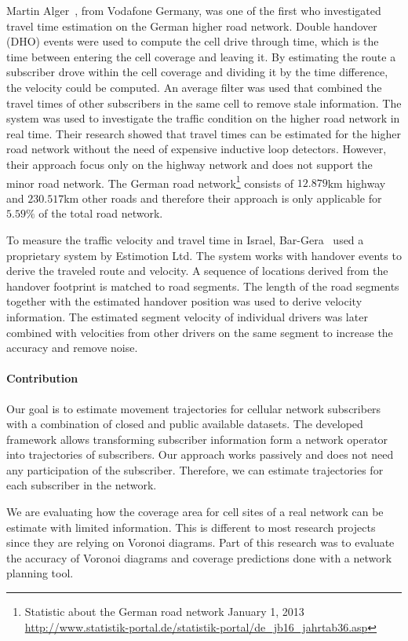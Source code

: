 \documentclass[twocolumn]{bmcart}%
\begin{document}
Martin Alger~\cite{Alger2004}, from Vodafone Germany, was one of the first who investigated travel time estimation on the German higher road network. Double handover (DHO) events were used to compute the cell drive through time, which is the time between entering the cell coverage and leaving it. By estimating the route a subscriber drove within the cell coverage and dividing it by the time difference, the velocity could be computed. An average filter was used that combined the travel times of other subscribers in the same cell to remove stale information. The system was used to investigate the traffic condition on the higher road network in real time. Their research showed that travel times can be estimated for the higher road network without the need of expensive inductive loop detectors. However, their approach focus only on the highway network and does not support the minor road network. The German road network\footnote{Statistic about the German road network January 1, 2013 \url{http://www.statistik-portal.de/statistik-portal/de_jb16_jahrtab36.asp}} consists of $12.879$km highway and $230.517$km other roads and therefore their approach is only applicable for $5.59\%$ of the total road network.\newline

To measure the traffic velocity and travel time in Israel, Bar-Gera~\cite{Bar2007} used a proprietary system by Estimotion Ltd. The system works with handover events to derive the traveled route and velocity. A sequence of locations derived from the handover footprint is matched to road segments. The length of the road segments together with the estimated handover position was used to derive velocity information. The estimated segment velocity of individual drivers was later combined with velocities from other drivers on the same segment to increase the accuracy and remove noise.

\paragraph*{Contribution}
Our goal is to estimate movement trajectories for cellular network subscribers with a combination of closed and public available datasets. The developed framework allows transforming subscriber information form a network operator into trajectories of subscribers. Our approach works passively and does not need any participation of the subscriber. Therefore, we can estimate trajectories for each subscriber in the network.

We are evaluating how the coverage area for cell sites of a real network can be estimate with limited information. This is different to most research projects~\cite{Gonzalez2008,Tettamanti2012} since they are relying on Voronoi diagrams. Part of this research was to evaluate the accuracy of Voronoi diagrams and coverage predictions done with a network planning tool.
\end{document}
